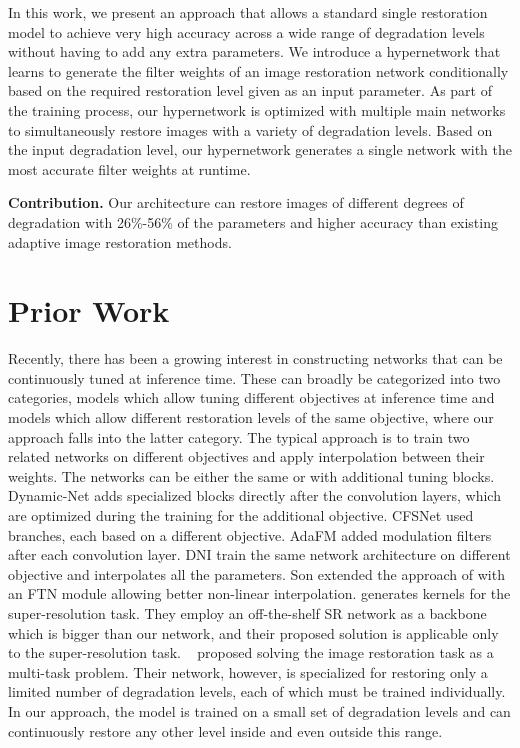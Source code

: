 \documentclass{article}
\begin{document}
In this work, we present an approach that allows a standard single restoration model to achieve very high accuracy across a wide range of degradation levels without having to add any extra parameters. We introduce a hypernetwork that learns to generate the filter weights of an image restoration network conditionally based on the required restoration level given as an input parameter. As part of the training process, our hypernetwork is optimized with multiple main networks to simultaneously restore images with a variety of degradation levels. Based on the input degradation level, our hypernetwork generates a single network with the most accurate filter weights at runtime.

{\bf Contribution.} Our architecture can restore images of different degrees of degradation with 26\%-56\% of the parameters and higher accuracy than existing adaptive image restoration methods.


\section{Prior Work}

Recently, there has been a growing interest in constructing networks that can be continuously tuned at inference time. These can broadly be categorized into two categories, models which allow tuning different objectives at inference time and models which allow different restoration levels of the same objective, where our approach falls into the latter category. The typical approach is to train two related networks on different objectives and apply interpolation between their weights. The networks can be either the same or with additional tuning blocks. Dynamic-Net \cite{dynamicnet} adds specialized blocks directly after the convolution layers, which are optimized during the training for the additional objective. 
CFSNet \cite{wang2019cfsnet} used branches, each based on a different objective. 
AdaFM \cite{He_2019_CVPR} added modulation filters after each convolution layer. DNI \cite{dnInterpolation} train the same network architecture on different objective and interpolates all the parameters. 
Son \cite{lee2020smoother} extended the approach of \cite{He_2019_CVPR} with an FTN module allowing better non-linear interpolation. \cite{meta_sr} generates kernels for the super-resolution task. They employ an off-the-shelf SR network \cite{rdn} as a backbone which is  bigger than our network, and their proposed solution is applicable only to the super-resolution task. ~\cite{jiang2021png} proposed solving the image restoration task as a multi-task problem. Their network, however, is specialized for restoring only a limited number of degradation levels, each of which must be trained individually. In our approach, the model is trained on a small set of degradation levels and can continuously restore any other level inside and even outside this range.
\end{document}
